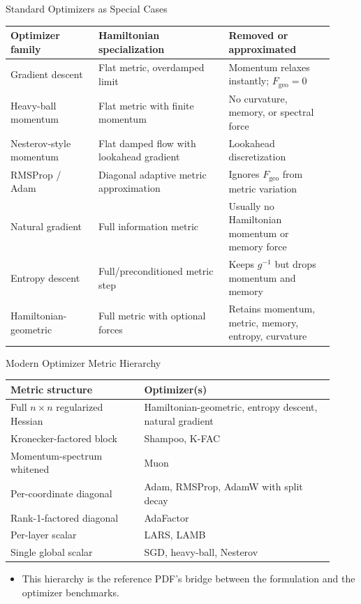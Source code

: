 ﻿\documentclass[aspectratio=169,11pt]{beamer}
\begin{document}
\begin{frame}{Standard Optimizers as Special Cases}
  \scriptsize
  \begin{tabular}{@{}p{0.25\linewidth}p{0.37\linewidth}p{0.30\linewidth}@{}}
    \toprule
    Optimizer family & Hamiltonian specialization & Removed or approximated \\
    \midrule
    Gradient descent & Flat metric, overdamped limit & Momentum relaxes instantly; $F_{\mathrm{geo}}=0$ \\
    Heavy-ball momentum & Flat metric with finite momentum & No curvature, memory, or spectral force \\
    Nesterov-style momentum & Flat damped flow with lookahead gradient & Lookahead discretization \\
    RMSProp / Adam & Diagonal adaptive metric approximation & Ignores $F_{\mathrm{geo}}$ from metric variation \\
    Natural gradient & Full information metric & Usually no Hamiltonian momentum or memory force \\
    Entropy descent & Full/preconditioned metric step & Keeps $g^{-1}$ but drops momentum and memory \\
    Hamiltonian-geometric & Full metric with optional forces & Retains momentum, metric, memory, entropy, curvature \\
    \bottomrule
  \end{tabular}
\end{frame}

\begin{frame}{Modern Optimizer Metric Hierarchy}
  \scriptsize
  \begin{tabular}{@{}p{0.38\linewidth}p{0.54\linewidth}@{}}
    \toprule
    Metric structure & Optimizer(s) \\
    \midrule
    Full $n\times n$ regularized Hessian & Hamiltonian-geometric, entropy descent, natural gradient \\
    Kronecker-factored block & Shampoo, K-FAC \\
    Momentum-spectrum whitened & Muon \\
    Per-coordinate diagonal & Adam, RMSProp, AdamW with split decay \\
    Rank-1-factored diagonal & AdaFactor \\
    Per-layer scalar & LARS, LAMB \\
    Single global scalar & SGD, heavy-ball, Nesterov \\
    \bottomrule
  \end{tabular}
  \vspace{0.8em}
  \begin{itemize}
    \item This hierarchy is the reference PDF's bridge between the formulation and the optimizer benchmarks.
  \end{itemize}
\end{frame}
\end{document}
